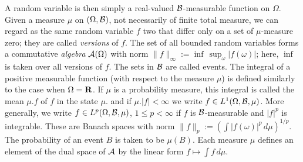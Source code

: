 A random variable is then simply a real-valued ${\cal B}$-measurable
function on $\Omega$. Given a measure $\mu$ on $(\Omega,{\cal
B})$, not necessarily of finite total measure, we can
regard as the same random variable $f$ two that differ only on
a set of $\mu$-measure zero; they are called {\em versions} of $f$.
The set of all bounded random variables forms a commutative {\em
algebra} ${\cal A}(\Omega)$ with norm $\|f\|_\infty:=\inf\,\sup_\omega
|f(\omega)|$; here, $\inf$ is taken over all versions of $f$.
The sets in ${\cal B}$ are called events. The integral
of a positive measurable function (with respect to the measure $\mu$) is
defined
similarly to the case when $\Omega={\bf R}$. If $\mu$ is a probability
measure, this integral is called the mean $\mu.f$ of $f$ in the state $\mu$.
and if $\mu.|f|<\infty$ we write $f\in L^1(\Omega,{\cal B},\mu)$.
More generally, we write $f\in L^p(\Omega,{\cal B},\mu)$, $1\leq p<\infty$
if $f$ is ${\cal B}$-measurable and $|f|^p$ is integrable. These are Banach
spaces with norm $\|f\|_p:=(\int |f(\omega)|^p\,d\mu)^{1/p}$.
The probability of an event $B$ is taken to be $\mu(B)$.
Each measure $\mu$ defines an element
of the dual space of ${\cal A}$ by the linear form $f\mapsto \int f\,d\mu$.

